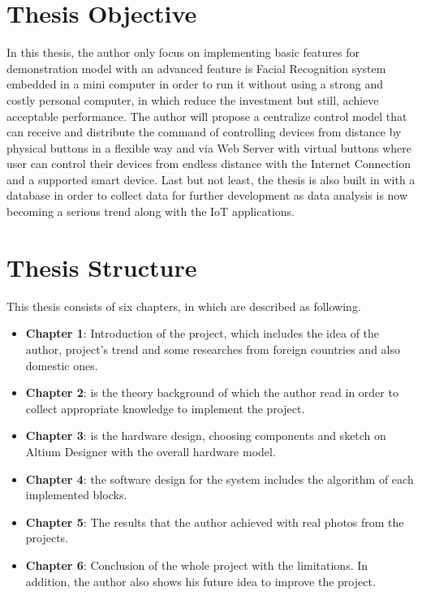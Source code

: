 \section{Thesis Objective}
In this thesis, the author only focus on implementing basic features for demonstration model with an advanced feature is Facial Recognition system embedded in a mini computer in order to run it without using a strong and costly personal computer, in which reduce the investment but still, achieve acceptable performance. The author will propose a centralize control model that can receive and distribute the command of controlling devices from distance by physical buttons in a flexible way and via Web Server with virtual buttons where user can control their devices from endless distance with the Internet Connection and a supported smart device. Last but not least, the thesis is also built in with a database in order to collect data for further development as data analysis is now becoming a serious trend along with the IoT applications.
\section{Thesis Structure}
This thesis consists of six chapters, in which are described as following.
\begin{itemize}
\item \textbf{Chapter 1}: Introduction of the project, which includes the idea of the author, project’s trend and some researches from foreign countries and also domestic ones.
\item \textbf{Chapter 2}: is the theory background of which the author read in order to collect appropriate knowledge to implement the project.
\item \textbf{Chapter 3}: is the hardware design, choosing components and sketch on Altium Designer with the overall hardware model.
\item \textbf{Chapter 4}: the software design for the system includes the algorithm of each implemented blocks.
\item \textbf{Chapter 5}: The results that the author achieved with real photos from the projects.
\item \textbf{Chapter 6}: Conclusion of the whole project with the limitations. In addition, the author also shows his future idea to improve the project.
\end{itemize}

